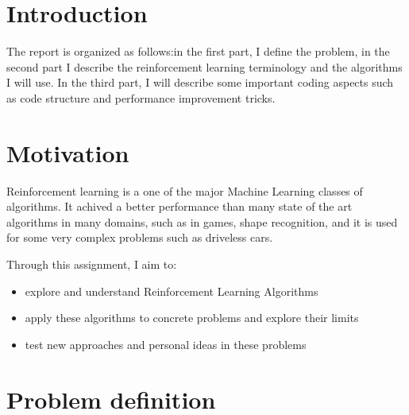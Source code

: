 \documentclass[12pt,a4paper]{article}
\begin{document}
\newpage
\tableofcontents


\newpage

\section*{Introduction}

The report is organized as follows:in the first part, I define the problem, in the second part I describe the reinforcement learning terminology and the algorithms I will use. In the third part, I will describe some important coding aspects such as code structure and performance improvement tricks.

\section*{Motivation}
Reinforcement learning is a one of the major Machine Learning classes of algorithms. It achived a better performance than many state of the art algorithms in many domains, such as in games\cite{mnih-dqn-2015}\cite{44806}, shape recognition\cite{DBLP:journals/corr/RezendeEMBJH16}, and it is used for some very complex problems such as driveless cars.

Through this assignment, I aim to:
\begin{itemize}
\item explore and understand Reinforcement Learning Algorithms
\item apply these algorithms to concrete problems and explore their limits
\item test new approaches and personal ideas in these problems
 \end{itemize}



\newpage
\section{Problem definition}
\end{document}
